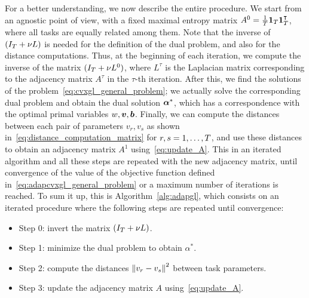 %
For a better understanding, we now describe the entire procedure. 
%
We start from an agnostic point of view, with a fixed maximal entropy matrix $A^0 = \frac{1}{T} \bm{1}_T \bm{1}_T^\intercal$, where all tasks are equally related among them.
%
Note that the inverse of $(I_T + \nu L)$ is needed for the definition of the dual problem, and also for the distance computations.
%
Thus, at the beginning of each iteration, we compute the inverse of the matrix $(I_T + \nu L^0)$, where $L^\tau$ is the Laplacian matrix corresponding to the adjacency matrix $A^\tau$ in the $\tau$-th iteration.
%
After this, we find the solutions of the problem~\eqref{eq:cvxgl_general_problem}; we actually solve the corresponding dual problem and obtain the dual solution $\bm{\alpha}^*$, which has a correspondence with the optimal primal variables $w, \bm{v}, \bm{b}$.
Finally, we can compute the distances between each pair of parameters $v_r, v_s$ as shown in~\eqref{eq:distance_computation_matrix} for $r, s=1, \ldots, T$, and use these distances to obtain an adjacency matrix $A^1$ using~\eqref{eq:update_A}.
%
%
This in an iterated algorithm and all these steps are repeated with the new adjacency matrix, until convergence of the value of the objective function defined in~\eqref{eq:adapcvxgl_general_problem} or a maximum number of iterations is reached. 
%
To sum it up, this is Algorithm~\ref{alg:adapgl}, which consists on an iterated procedure where the following steps are repeated until convergence:
\begin{itemize}
    \item Step 0: invert the matrix $(I_T + \nu L)$.
    \item Step 1: minimize the dual problem to obtain $\alpha^*$.
    \item Step 2: compute the distances $\left\lVert v_r - v_s\right\rVert^2$ between task parameters.
    \item Step 3: update the adjacency matrix $A$ using~\eqref{eq:update_A}.
\end{itemize}


